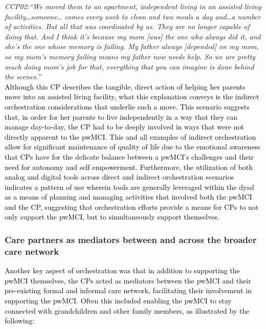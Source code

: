 \documentclass[acmsmall]{acmart}
\begin{document}
\textit{CCP02:“We moved them to an apartment, independent living in an assisted living facility…someone…
comes every week to clean and two meals a day and…a number of activities. But all that was coordinated by us. They are no longer capable of doing that. And I think it's because my mom [was] the one who always did it, and she's the one whose memory is failing. My father always [depended] on my mom, so my mom's memory failing means my father now needs help. So we are pretty much doing mom's job for that, everything that you can imagine is done behind the scenes.”}
\\

\textcolor{black}{Although this CP describes the tangible\textcolor{black}{,} direct action of helping her parents move into an assisted living facility, what this explanation conveys is the indirect orchestration considerations that underlie such a move. This scenario suggests that, in order for her parents to live independently in a way that they can manage day-to-day, the CP had to be deeply involved in ways that were not directly apparent to the pwMCI. This and all examples of indirect orchestration allow for significant maintenance of quality of life due to the emotional awareness that CPs have for the delicate balance between a pwMCI’s challenges and their need for autonomy and self empowerment. Furthermore, the utilization of both analog and digital tools across direct and indirect orchestration scenarios indicates a pattern of use wherein tools are generally leveraged within the dyad as a means of planning and managing activities that involved both the pwMCI and the CP, suggesting that orchestration efforts provide a means for CPs to not only support the pwMCI, but to simultaneously support themselves.}


\subsubsection{Care partners as mediators between and across the broader care network}

\textcolor{black}{Another key aspect of orchestration was that  in addition to supporting the pwMCI themselves, the CPs acted as mediators between the pwMCI and their pre-existing formal and informal care network, facilitating their involvement in supporting the pwMCI. Often this included enabling the pwMCI to stay connected with grandchildren and other family members, as illustrated by the following:}
\\
\end{document}

